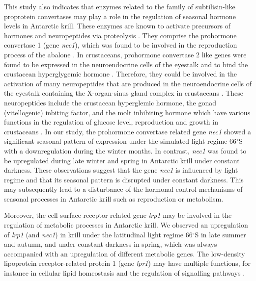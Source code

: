 This study also indicates that enzymes related to the family of subtilisin-like
proprotein convertases may play a role in the regulation of seasonal hormone
levels in Antarctic krill. These enzymes are known to activate precursors of
hormones and neuropeptides via proteolysis \citep{zhou_proteolytic_1999}. They
comprise the prohormone convertase 1 (gene \textit{nec1}), which was found to
be involved in the reproduction process of the abalone
\citep{zhou_next-generation_2010}. In crustaceans, prohormone convertase 2 like
genes were found to be expressed in the neuroendocrine cells of the eyestalk
\citep{toullec_molecular_2002} and to bind the crustacean hyperglygemic hormone
\citep{tangprasittipap_structure_2012}. Therefore, they could be involved in
the activation of many neuropeptides that are produced in the neuroendocrine
cells of the eyestalk containing the X-organ-sinus gland complex in crustaceans
\citep{tangprasittipap_structure_2012, toullec_molecular_2002}. These
neuropeptides include the crustacean hyperglemic hormone, the gonad
(vitellogenic) inbiting factor, and the molt inhibiting hormone which have
various functions in the regulation of glucose level, reproduction and growth
in crustaceans \citep{nagaraju_reproductive_2011}. In our study, the prohormone
convertase related gene \textit{nec1} showed a significant seasonal pattern of
expression under the simulated light regime 66$^{\circ}$S with a downregulation
during the winter months. In contrast, \textit{nec1} was found to be
upregulated during late winter and spring in Antarctic krill under constant
darkness. These observations suggest that the gene \textit{nec1} is influenced
by light regime and that its seasonal pattern is disrupted under constant
darkness. This may subsequently lead to a disturbance of the hormonal control
mechanisms of seasonal processes in Antarctic krill such as reproduction or
metabolism. 

Moreover, the cell-surface receptor related gene \textit{lrp1} may be involved
in the regulation of metabolic processes in Antarctic krill. We observed an
upregulation of \textit{lrp1} (and \textit{nec1}) in krill under the
latitudinal light regime 66$^{\circ}$S in late summer and autumn, and under
constant darkness in spring, which was always accompanied with an upregulation
of different metabolic genes. The low-density lipoprotein receptor-related
protein 1 (gene \textit{lpr1}) may have multiple functions, for instance in
cellular lipid homeostasis and the regulation of signalling pathways
\citep{franchini_low-density_2011}.

